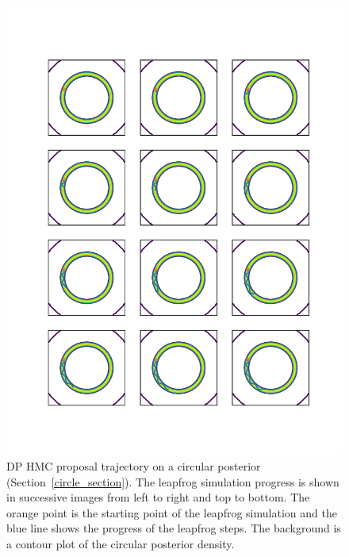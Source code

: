 \documentclass[english,twoside,openright]{HYgraduMLDS}
\begin{document}
\begin{figure}[h]
	\centering
  \includegraphics[width=\textwidth]{figures/hmc_trajectory}
  \caption{
    DP HMC proposal trajectory on a circular posterior
    (Section~\ref{circle_section}). The leapfrog simulation progress is shown
    in successive images from left to right and top to bottom.
    The orange point is the starting
    point of the leapfrog simulation and the blue line shows the progress
    of the leapfrog steps. The background is a contour plot of the circular
    posterior density.
  }
  \label{hmc_trajectory_fig}
\end{figure}

\end{document}
